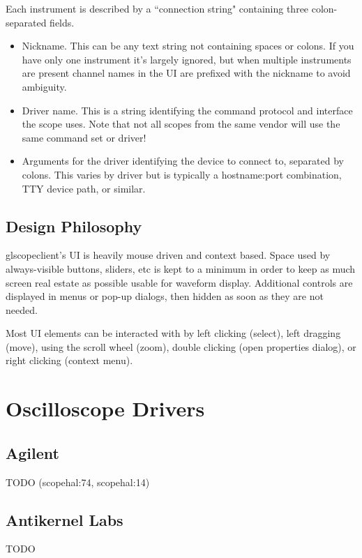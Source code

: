 \documentclass[11pt]{article}
\begin{document}
Each instrument is described by a ``connection string" containing three colon-separated fields.

\begin{itemize}
\item Nickname. This can be any text string not containing spaces or colons. If you have only one instrument it's
largely ignored, but when multiple instruments are present channel names in the UI are prefixed with the nickname to
avoid ambiguity.
\item Driver name. This is a string identifying the command protocol and interface the scope uses. Note that not all
scopes from the same vendor will use the same command set or driver!
\item Arguments for the driver identifying the device to connect to, separated by colons. This varies by driver but is
typically a hostname:port combination, TTY device path, or similar.
\end{itemize}

\subsection{Design Philosophy}

glscopeclient's UI is heavily mouse driven and context based. Space used by always-visible buttons, sliders, etc is
kept to a minimum in order to keep as much screen real estate as possible usable for waveform display. Additional
controls are displayed in menus or pop-up dialogs, then hidden as soon as they are not needed.

Most UI elements can be interacted with by left clicking (select), left dragging (move), using the scroll wheel (zoom),
double clicking (open properties dialog), or right clicking (context menu).

\pagebreak
\section{Oscilloscope Drivers}
\label{sec:drivers}

\subsection{Agilent}
TODO (scopehal:74, scopehal:14)

\subsection{Antikernel Labs}
TODO
\end{document}
